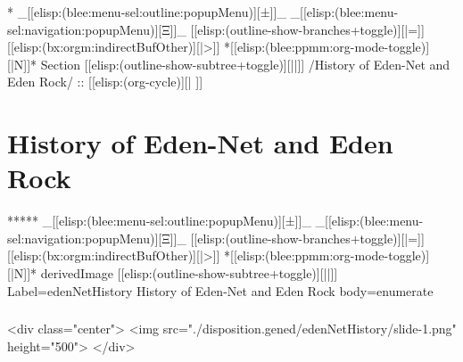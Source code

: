 

\begin{whenOrg}
*  _[[elisp:(blee:menu-sel:outline:popupMenu)][±]]_ _[[elisp:(blee:menu-sel:navigation:popupMenu)][Ξ]]_ [[elisp:(outline-show-branches+toggle)][|=]] [[elisp:(bx:orgm:indirectBufOther)][|>]] *[[elisp:(blee:ppmm:org-mode-toggle)][|N]]*  Section    [[elisp:(outline-show-subtree+toggle)][||]]   /History of Eden-Net and Eden Rock/ ::  [[elisp:(org-cycle)][| ]]
\end{whenOrg}

\section{History of Eden-Net and Eden Rock}

\begin{whenOrg}
*****  _[[elisp:(blee:menu-sel:outline:popupMenu)][±]]_ _[[elisp:(blee:menu-sel:navigation:popupMenu)][Ξ]]_ [[elisp:(outline-show-branches+toggle)][|=]] [[elisp:(bx:orgm:indirectBufOther)][|>]] *[[elisp:(blee:ppmm:org-mode-toggle)][|N]]*  derivedImage [[elisp:(outline-show-subtree+toggle)][||]] Label=edenNetHistory History of Eden-Net and Eden Rock body=enumerate
\end{whenOrg}

\begin{htmlonly}

\begin{frame}[fragile,plain,label=edenNetHistory]
    \frametitle{}
    \framesubtitle{}
    \begin{rawhtml}
<div class="center">
<img src="./disposition.gened/edenNetHistory/slide-1.png" height="500">
</div>
    \end{rawhtml}
\end{frame}
\end{htmlonly}

